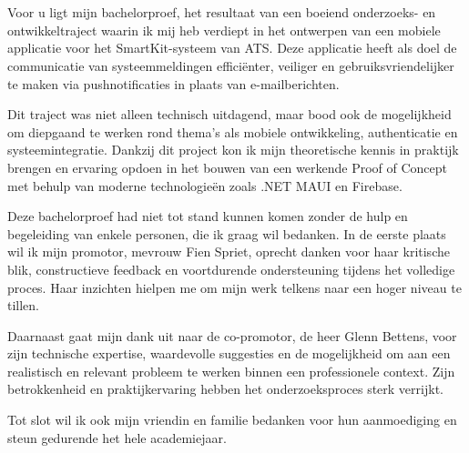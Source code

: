
\chapter*{}%
\label{ch:voorwoord}


Voor u ligt mijn bachelorproef, het resultaat van een boeiend onderzoeks- en ontwikkeltraject waarin ik mij heb verdiept in het ontwerpen van een mobiele applicatie voor het SmartKit-systeem van ATS. Deze applicatie heeft als doel de communicatie van systeemmeldingen efficiënter, veiliger en gebruiksvriendelijker te maken via pushnotificaties in plaats van e-mailberichten.

Dit traject was niet alleen technisch uitdagend, maar bood ook de mogelijkheid om diepgaand te werken rond thema’s als mobiele ontwikkeling, authenticatie en systeemintegratie. Dankzij dit project kon ik mijn theoretische kennis in praktijk brengen en ervaring opdoen in het bouwen van een werkende Proof of Concept met behulp van moderne technologieën zoals .NET MAUI en Firebase.

Deze bachelorproef had niet tot stand kunnen komen zonder de hulp en begeleiding van enkele personen, die ik graag wil bedanken. In de eerste plaats wil ik mijn promotor, mevrouw Fien Spriet, oprecht danken voor haar kritische blik, constructieve feedback en voortdurende ondersteuning tijdens het volledige proces. Haar inzichten hielpen me om mijn werk telkens naar een hoger niveau te tillen.

Daarnaast gaat mijn dank uit naar de co-promotor, de heer Glenn Bettens, voor zijn technische expertise, waardevolle suggesties en de mogelijkheid om aan een realistisch en relevant probleem te werken binnen een professionele context. Zijn betrokkenheid en praktijkervaring hebben het onderzoeksproces sterk verrijkt.

Tot slot wil ik ook mijn vriendin en familie bedanken voor hun aanmoediging en steun gedurende het hele academiejaar.